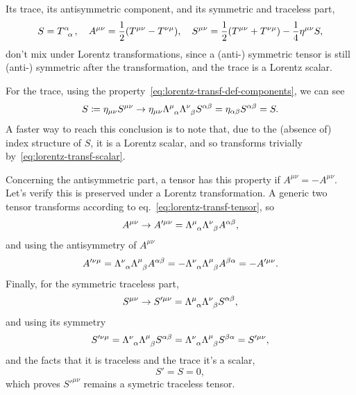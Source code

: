 Its trace, its antisymmetric component, and its symmetric and traceless part,
\begin{equation}
   S = \tensor{T}{^\alpha_\alpha} , \quad A^{\mu\nu} = \frac{1}{2} (T^{\mu\nu} - T^{\nu\mu}), \quad S^{\mu\nu} = \frac{1}{2} (T^{\mu\nu} + T^{\nu\mu}) - \frac{1}{4} \eta^{\mu\nu} S, 
\end{equation}
don't mix under Lorentz transformations, since a (anti-) symmetric tensor is still (anti-) symmetric after the transformation, and the trace is a Lorentz scalar.
\begin{mdframed}
\begin{innerproof}
    For the trace, using the property~\eqref{eq:lorentz-transf-def-components}, we can see
    \begin{equation*}
       S \coloneq \eta_{\mu\nu} S^{\mu\nu} \to \eta_{\mu\nu} \tensor{\Lambda}{^\mu_\alpha} \tensor{\Lambda}{^\nu_\beta} S^{\alpha\beta} = \eta_{\alpha\beta} S^{\alpha\beta} = S .
    \end{equation*}
    A faster way to reach this conclusion is to note that, due to the (absence of) index structure of $S$, it is a Lorentz scalar, and so transforms trivially by~\eqref{eq:lorentz-transf-scalar}.

    Concerning the antisymmetric part, a tensor has this property if $A^{\mu\nu} = - A^{\mu\nu}$. Let's verify this is preserved under a Lorentz transformation. A generic two tensor transforms according to eq.~\eqref{eq:lorentz-transf-tensor}, so
    \begin{equation*}
       A^{\mu\nu} \to A'^{\mu\nu} = \tensor{\Lambda}{^\mu_\alpha} \tensor{\Lambda}{^\nu_\beta} A^{\alpha\beta} ,
    \end{equation*}
    and using the antisymmetry of $A^{\mu\nu}$
    \begin{equation*}
        A'^{\nu\mu} = \tensor{\Lambda}{^\nu_\alpha} \tensor{\Lambda}{^\mu_\beta} A^{\alpha\beta} = - \tensor{\Lambda}{^\nu_\alpha} \tensor{\Lambda}{^\mu_\beta} A^{\beta\alpha} = -A'^{\mu\nu} .
    \end{equation*}
    Finally, for the symmetric traceless part,
    \begin{equation*}
        S^{\mu\nu} \to S'^{\mu\nu} = \tensor{\Lambda}{^\mu_\alpha} \tensor{\Lambda}{^\nu_\beta} S^{\alpha\beta} ,
    \end{equation*}
    and using its symmetry
    \begin{equation*}
        S'^{\nu\mu} = \tensor{\Lambda}{^\nu_\alpha} \tensor{\Lambda}{^\mu_\beta} S^{\alpha\beta} = \tensor{\Lambda}{^\nu_\alpha} \tensor{\Lambda}{^\mu_\beta} S^{\beta\alpha} = S'^{\mu\nu} ,
    \end{equation*}
    and the facts that it is traceless and the trace it's a scalar,
    \begin{equation*}
        S' = S = 0,
    \end{equation*}
    which proves $S'^{\mu\nu}$ remains a symetric traceless tensor. 
\end{innerproof}
\end{mdframed}

